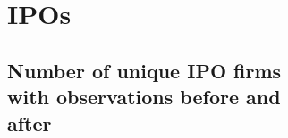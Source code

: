 \documentclass[12pt,notitlepage]{article}
\begin{document}
\begin{figure}[!htpb]
\begin{subfigure}{.49\textwidth}




\FloatBarrier
\section{IPOs} %
\label{sec:ipos}
\FloatBarrier




\subsection{Number of unique IPO firms with observations before and after}

\begin{table}[!htpb]
\end{table}




\end{subfigure}
\end{figure}
\end{document}
